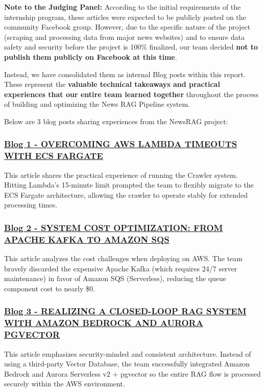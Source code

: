 \textbf{Note to the Judging Panel:} According to the initial
requirements of the internship program, these articles were expected to
be publicly posted on the community Facebook group. However, due to the
specific nature of the project (scraping and processing data from major
news websites) and to ensure data safety and security before the project
is 100\% finalized, our team decided \textbf{not to publish them
publicly on Facebook at this time}.

Instead, we have consolidated them as internal Blog posts within this
report. These represent the \textbf{valuable technical takeaways and
practical experiences that our entire team learned together} throughout
the process of building and optimizing the News RAG Pipeline system.

Below are 3 blog posts sharing experiences from the NewsRAG project:

\hypertarget{blog-1---overcoming-aws-lambda-timeouts-with-ecs-fargate}{%
\subsubsection{\texorpdfstring{\href{3.1-Blog1/}{Blog 1 - OVERCOMING AWS
LAMBDA TIMEOUTS WITH ECS
FARGATE}}{Blog 1 - OVERCOMING AWS LAMBDA TIMEOUTS WITH ECS FARGATE}}}

This article shares the practical experience of running the Crawler
system. Hitting Lambda's 15-minute limit prompted the team to flexibly
migrate to the ECS Fargate architecture, allowing the crawler to operate
stably for extended processing times.

\hypertarget{blog-2---system-cost-optimization-from-apache-kafka-to-amazon-sqs}{%
\subsubsection{\texorpdfstring{\href{3.2-Blog2/}{Blog 2 - SYSTEM COST
OPTIMIZATION: FROM APACHE KAFKA TO AMAZON
SQS}}{Blog 2 - SYSTEM COST OPTIMIZATION: FROM APACHE KAFKA TO AMAZON SQS}}}

This article analyzes the cost challenges when deploying on AWS. The
team bravely discarded the expensive Apache Kafka (which requires 24/7
server maintenance) in favor of Amazon SQS (Serverless), reducing the
queue component cost to nearly \$0.

\hypertarget{blog-3---realizing-a-closed-loop-rag-system-with-amazon-bedrock-and-aurora-pgvector}{%
\subsubsection{\texorpdfstring{\href{3.3-Blog3/}{Blog 3 - REALIZING A
CLOSED-LOOP RAG SYSTEM WITH AMAZON BEDROCK AND AURORA
PGVECTOR}}{Blog 3 - REALIZING A CLOSED-LOOP RAG SYSTEM WITH AMAZON BEDROCK AND AURORA PGVECTOR}}}

This article emphasizes security-minded and consistent architecture.
Instead of using a third-party Vector Database, the team successfully
integrated Amazon Bedrock and Aurora Serverless v2 + pgvector so the
entire RAG flow is processed securely within the AWS environment.
